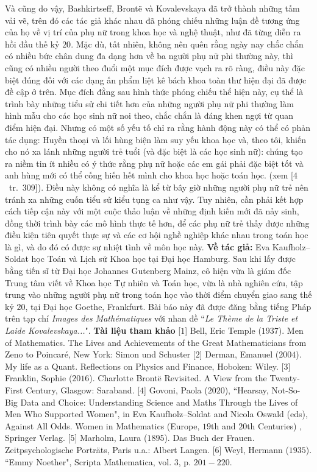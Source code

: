 \begin{multicols}{2}
	\vskip 0.1cm
	Và cũng do vậy, Bashkirtseff, Brontë và Kovalevskaya đã trở thành những tấm vải vẽ, trên đó các tác giả khác nhau đã phóng chiếu  những luận đề tương ứng của họ về vị trí của phụ nữ trong khoa học và nghệ thuật, như đã từng diễn ra hồi đầu thế kỷ $20$. Mặc dù, tất nhiên, không nên quên rằng ngày nay chắc chắn có nhiều bức chân dung đa dạng hơn về ba người phụ nữ phi thường này, thì cũng có nhiều người theo đuổi một mục đích được vạch ra rõ ràng, điều này đặc biệt đúng đối với các dạng ấn phẩm liệt kê bách khoa toàn thư hiện đại đã được đề cập ở trên. Mục đích đằng sau hình thức phóng chiếu thể hiện này, cụ thể là trình bày những tiểu sử chi tiết hơn của những người phụ nữ phi thường  làm hình mẫu cho các học sinh nữ noi theo, chắc chắn là đáng khen ngợi từ quan điểm hiện đại. Nhưng có một số yếu tố chỉ ra rằng hành động này có thể có phản tác dụng:
	\vskip 0.1cm
	Huyền thoại và lối hùng biện làm suy yếu khoa học và, theo tôi, khiến cho nó xa lánh những người trẻ tuổi (và đặc biệt là các học sinh nữ): chúng tạo ra niềm tin ít nhiều có ý thức rằng phụ nữ hoặc các em gái phải đặc biệt tốt và anh hùng mới có thể cống hiến hết mình cho khoa học hoặc toán học. (xem [$4$~tr.~$309$]).
	\vskip 0.1cm
	Điều này không có nghĩa là kể từ bây giờ những người phụ nữ trẻ nên tránh xa những cuốn tiểu sử kiểu tụng ca như vậy. Tuy nhiên, cần phải kết hợp cách tiếp cận này với một cuộc thảo luận về những định kiến mới đã nảy sinh, đồng thời trình bày các mô hình thực tế hơn, để các phụ nữ trẻ thấy được những điều kiện tiên quyết thực sự và các cơ hội nghề nghiệp khác nhau trong toán học là gì, và do đó có được sự nhiệt tình về môn học này.
	\vskip 0.1cm
	\textbf{\color{lichsutoanhoc}Về tác giả:} Eva Kaufholz--Soldat học Toán và Lịch sử Khoa học tại Đại học Hamburg. Sau khi lấy được bằng tiến sĩ từ Đại học Johannes Gutenberg Mainz, cô hiện vừa là giám đốc Trung tâm viết về Khoa học Tự nhiên và Toán học, vừa là nhà nghiên cứu, tập trung vào những người phụ nữ trong toán học vào thời điểm chuyển giao sang thế kỷ $20$, tại Đại học Goethe, Frankfurt. Bài báo này đã được đăng bằng tiếng Pháp trên tạp chí \textit{Images des Mathématiques} với nhan đề ``\textit{Le Thème de la Triste et Laide Kovalevskaya...}".
	\vskip 0.1cm
	\textbf{\color{lichsutoanhoc}Tài liệu tham khảo}
	\vskip 0.1cm
	[$1$] Bell, Eric Temple ($1937$). Men of Mathematics. The Lives and Achievements of the Great Mathematicians from Zeno to Poincaré, New York: Simon und Schuster
	\vskip 0.1cm
	[$2$] Derman, Emanuel ($2004$). My life as a Quant. Reflections on Physics and Finance, Hoboken: Wiley.
	\vskip 0.1cm
	[$3$] Franklin, Sophie ($2016$). Charlotte Brontë Revisited. A View from the Twenty-First Century, Glasgow: Saraband.
	\vskip 0.1cm
	[$4$] Govoni, Paola ($2020$), ``Hearsay, Not-So-Big Data and Choice: Understanding Science and Maths Through the Lives of Men Who Supported Women", in Eva Kaufholz--Soldat and Nicola Oswald (eds), Against All Odds. Women in Mathematics (Europe, $19$th and $20$th Centuries) , Springer Verlag.
	\vskip 0.1cm
	[$5$] Marholm, Laura ($1895$). Das Buch der Frauen. Zeitpsychologische Porträts, Paris u.a.: Albert Langen.
	\vskip 0.1cm
	[$6$] Weyl, Hermann ($1935$). ``Emmy Noether", Scripta Mathematica, vol. $3$, p. $201-220$.
\end{multicols}